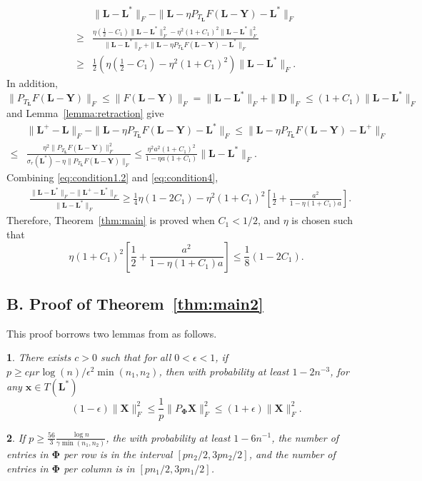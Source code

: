 \documentclass[12pt]{article}
\newcommand{\bx}{\boldsymbol{x}}
\newcommand{\bX}{\boldsymbol{X}}
\newcommand{\bL}{\boldsymbol{L}}
\newcommand{\bD}{\boldsymbol{D}}
\def\bx{\boldsymbol{x}}
\def\bY{\boldsymbol{Y}}
\theoremstyle{plain}
\newtheorem{lem}{\protect\lemmaname}
\theoremstyle{definition}
\theoremstyle{plain}
\theoremstyle{plain}
\theoremstyle{remark}
\providecommand{\lemmaname}{Lemma}
\begin{document}
\begin{align}\nonumber
 & \|\bL-\bL^{*}\|_{F}-\|\bL-\eta P_{T_{\bL}}F(\bL-\bY)-\bL^{*}\|_{F}\\
\geq & \frac{\eta(\frac{1}{2}-C_{1})\|\bL-\bL^{*}\|_{F}^{2}-\eta^{2}(1+C_{1})^{2}\|\bL-\bL^{*}\|_{F}^{2}}{\|\bL-\bL^{*}\|_{F}+\|\bL-\eta P_{T_{\bL}}F(\bL-\bY)-\bL^{*}\|_{F}}\nonumber\\
\geq & \frac{1}{2}\left(\eta(\frac{1}{2}-C_{1})-\eta^{2}(1+C_{1})^{2}\right)\|\bL-\bL^{*}\|_{F}.\label{eq:condition1.2}
\end{align}
In addition, \begin{equation}
\|P_{T_{\bL}} F(\bL-\bY)\|_F\leq \|F(\bL-\bY)\|_F= \|\bL-\bL^*\|_F+\|\bD\|_F\leq (1+C_1)\|\bL-\bL^*\|_F\label{eq:condition3.5}\end{equation} and Lemma~\ref{lemma:retraction} give
\begin{align}\nonumber
&\|\bL^+-\bL\|_F-\|\bL-\eta P_{T_{\bL}} F(\bL-\bY)-\bL^*\|_F\leq \|\bL-\eta P_{T_{\bL}} F(\bL-\bY)-\bL^+\|_F\\\leq& \frac{\eta^2\|P_{T_{\bL}} F(\bL-\bY)\|_F^2}{\sigma_r(\bL^*)-\eta\|P_{T_{\bL}} F(\bL-\bY)\|_F}\leq\frac{\eta^2a^2(1+C_1)^2}{1-\eta a(1+C_1)}\|\bL-\bL^*\|_F.\label{eq:condition4}
\end{align}
Combining \eqref{eq:condition1.2} and \eqref{eq:condition4},
\begin{align*}
&\frac{\|\bL-\bL^*\|_F-\|\bL^+-\bL^*\|_F}{\|\bL-\bL^*\|_F}\geq  \frac{1}{4} \eta(1-2C_1)-\eta^2(1+C_1)^2\left[\frac{1}{2}+\frac{a^2}{1-\eta(1+C_1)a}\right].
\end{align*}
Therefore, Theorem~\ref{thm:main} is proved when $C_1<1/2$, and $\eta$ is chosen such that
\[
\eta(1+C_1)^2\left[\frac{1}{2}+\frac{a^2}{1-\eta(1+C_1)a}\right]\leq \frac{1}{8} (1-2C_1).
\]

\subsection*{B. Proof of Theorem~\ref{thm:main2}}
This proof borrows two lemmas from \cite[lemma 9, 10]{DBLP:conf/nips/YiPCC16} as follows.
\begin{lem}\label{lemma:concentration}{\cite[Lemma 9]{DBLP:conf/nips/YiPCC16}} 
There exists $c>0$ such that for all $0<\epsilon<1$, if $p\geq c\mu r\log(n)/\epsilon^2\min(n_1,n_2)$, then with probability at least $1-2n^{-3}$, for any $\bx\in T(\bL^*)$
\[
(1-\epsilon)\|\bX\|_F^2\leq \frac{1}{p}\|P_{\mathbf{\Phi}}\bX\|_F^2\leq  (1+\epsilon)\|\bX\|_F^2.
\]
\end{lem}
\begin{lem}\label{lemma:sampling}{\cite[Lemma 10]{DBLP:conf/nips/YiPCC16}} 
 If $p\geq \frac{56}{3}\frac{\log n}{\gamma \min(n_1,n_2)}$, the with probability at least $1-6n^{-1}$, the number of entries in $\mathbf{\Phi}$ per row is in the interval $[pn_2/2,3pn_2/2]$, and the number of entries in $\mathbf{\Phi}$ per column is in $[pn_1/2,3pn_1/2]$.
\end{lem}
\end{document}
